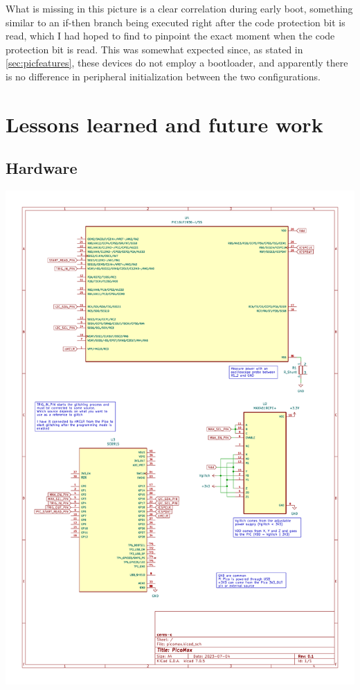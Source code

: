 \documentclass[a4paper,english,twoside,10pt]{article}
\begin{document}
What is missing in this picture is a clear correlation during early boot, something similar to an if-then branch being executed right after the code protection bit is read, which I had hoped to find to pinpoint the exact moment when the code protection bit is read. This was somewhat expected since, as stated in \autoref{sec:picfeatures}, these devices do not employ a bootloader, and apparently there is no difference in peripheral initialization between the two configurations.

\section{Lessons learned and future work}



\clearpage%
\printglossary[type=\acronymtype]%
\printglossary%
{
\raggedright%


}

\clearpage%
\begin{appendix}
\section{Hardware}\label{app:hardware}
\begin{center}
	\includegraphics[height=.95\textheight]{../hardware/schematic.pdf}
\end{center}
\end{appendix}
\end{document}
